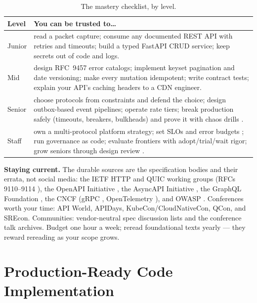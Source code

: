 \begin{table}[htbp]
  \centering
  \small
  \begin{tabularx}{\textwidth}{l X}
    \toprule
    \textbf{Level} & \textbf{You can be trusted to\ldots} \\
    \midrule
    Junior &
      read a packet capture; consume any documented REST API with retries
      and timeouts; build a typed FastAPI CRUD service; keep secrets out of
      code and logs. \\
    Mid &
      design RFC~9457 error catalogs; implement keyset pagination and date
      versioning; make every mutation idempotent; write contract tests;
      explain your API's caching headers to a CDN engineer. \\
    Senior &
      choose protocols from constraints and defend the choice; design
      outbox-based event pipelines; operate rate tiers; break production
      safely (timeouts, breakers, bulkheads) and prove it with chaos
      drills \cite{nygard2018releaseit}. \\
    Staff &
      own a multi-protocol platform strategy; set SLOs and error budgets
      \cite{beyer2016sre}; run governance as code; evaluate frontiers with
      adopt/trial/wait rigor; grow seniors through design review
      \cite{gehl2021apidesign}. \\
    \bottomrule
  \end{tabularx}
  \caption{The mastery checklist, by level.}
  \label{tab:competencies}
\end{table}

\textbf{Staying current.} The durable sources are the specification bodies
and their errata, not social media: the IETF HTTP and QUIC working groups
(RFCs 9110--9114 \cite{rfc9110,rfc9114}), the OpenAPI Initiative
\cite{openapi31}, the AsyncAPI Initiative \cite{asyncapi}, the GraphQL
Foundation \cite{graphqlspec}, the CNCF (gRPC \cite{grpcdocs}, OpenTelemetry
\cite{opentelemetrydocs}), and OWASP \cite{owaspapisecurity}. Conferences
worth your time: API World, APIDays, KubeCon/CloudNativeCon, QCon, and SREcon.
Communities: vendor-neutral spec discussion lists and the conference talk
archives. Budget one hour a week; reread foundational texts
\cite{fielding2000rest,kleppmann2017ddia,newman2021microservices} yearly ---
they reward rereading as your scope grows.

\section{Production-Ready Code Implementation}
\label{sec:code}

